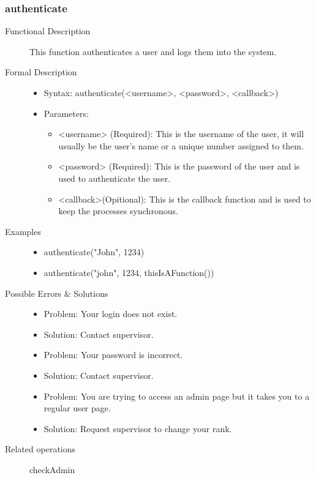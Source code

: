 \documentclass[a4paper]{article}
\begin{document}
\subsubsection{authenticate} 
\begin{description}
\item[Functional Description] This function authenticates a user and logs them into the system.
\item[Formal Description]\hfill
\begin{itemize}
	\item Syntax: authenticate(<username>, <password>, <callback>)\\
	\item Parameters:
		\begin{itemize}
			\item <username> (Required): This is the username of the user, it will usually be the user's name or a unique number assigned to them.
			\item <password> (Required): This is the password of the user and is used to authenticate the user.
			\item <callback>(Opitional): This is the callback function and is used to keep the processes synchronous.
		\end{itemize}
\end{itemize}
\item[Examples]\hfill
\begin{itemize}
	\item authenticate("John", 1234)
	\item authenticate("john", 1234, thisIsAFunction(){})
\end{itemize}
\item[Possible Errors \&  Solutions]\hfill
	\begin{itemize}
		\item Problem: Your login does not exist.
		\item Solution: Contact supervisor.
		\item Problem: Your password is incorrect.
		\item Solution: Contact supervisor.
		\item Problem: You are trying to access an admin page but it takes you to a regular user page.
		\item Solution: Request supervisor to change your rank.
	\end{itemize}
\item [Related operations]	checkAdmin
\end{description}
\end{document}
